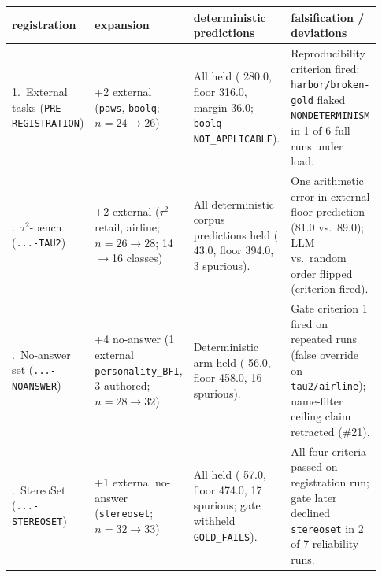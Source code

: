 \begin{tabular}{@{}p{0.19\linewidth}p{0.20\linewidth}p{0.26\linewidth}p{0.28\linewidth}@{}}
\toprule
registration & expansion & deterministic predictions & falsification / deviations \\
\midrule
1.\ External tasks (\texttt{PRE-REGISTRATION}) & +2 external (\texttt{paws}, \texttt{boolq}; $n=24 \to 26$) & All held (\assay{} 280.0, floor 316.0, margin 36.0; \texttt{boolq} \texttt{NOT\_APPLICABLE}). & Reproducibility criterion fired: \texttt{harbor/broken-gold} flaked \texttt{NONDETERMINISM} in 1 of 6 full runs under load. \\
\addlinespace[3pt]
2.\ $\tau^2$-bench (\texttt{...-TAU2}) & +2 external ($\tau^2$ retail, airline; $n=26 \to 28$; 14$\to$16 classes) & All deterministic corpus predictions held (\assay{} 43.0, floor 394.0, 3 spurious). & One arithmetic error in external floor prediction (81.0 vs.\ 89.0); LLM vs.\ random order flipped (criterion fired). \\
\addlinespace[3pt]
3.\ No-answer set (\texttt{...-NOANSWER}) & +4 no-answer (1 external \texttt{personality\_BFI}, 3 authored; $n=28 \to 32$) & Deterministic arm held (\assay{} 56.0, floor 458.0, 16 spurious). & Gate criterion 1 fired on repeated runs (false override on \texttt{tau2/airline}); name-filter ceiling claim retracted (\#21). \\
\addlinespace[3pt]
4.\ StereoSet (\texttt{...-STEREOSET}) & +1 external no-answer (\texttt{stereoset}; $n=32 \to 33$) & All held (\assay{} 57.0, floor 474.0, 17 spurious; gate withheld \texttt{GOLD\_FAILS}). & All four criteria passed on registration run; gate later declined \texttt{stereoset} in 2 of 7 reliability runs. \\
\bottomrule
\end{tabular}
